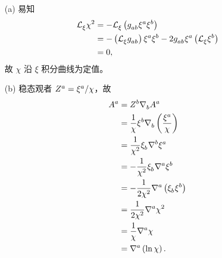 \begin{xiti}
    \begin{zm}
        \begin{enumerate}
            \item[(a)] 易知
            \begin{equation*}
                \begin{split}
                    \Ld{\xi} \chi^2 &= - \Ld{\xi} \left( \tensor{g}{_a_b} \tensor{\xi}{^a} \tensor{\xi}{^b} \right)\\
                    &= - \left( \Ld{\xi} \tensor{g}{_a_b} \right) \tensor{\xi}{^a} \tensor{\xi}{^b} - 2 \tensor{g}{_a_b} \tensor{\xi}{^a} \left( \Ld{\xi} \tensor{\xi}{^b} \right)\\
                    &= 0,
                \end{split}
            \end{equation*}
            故 $\chi$ 沿 $\xi$ 积分曲线为定值。
            \item[(b)] 稳态观者 $\tensor{Z}{^a} = \tensor{\xi}{^a}/\chi$，故
            \begin{align*}
                \tensor{A}{^a} &= \tensor{Z}{^b} \Nabla{b} \tensor{A}{^a}\\
                &= \frac{1}{\chi} \tensor{\xi}{^b} \Nabla{b} \left( \frac{\tensor{\xi}{^a}}{\chi} \right)\\
                &= \frac{1}{\chi^2} \tensor{\xi}{_b} \tensor{\nabla}{^b} \tensor{\xi}{^a}\\
                &= - \frac{1}{\chi^2} \tensor{\xi}{_b} \tensor{\nabla}{^a} \tensor{\xi}{^b}\\
                &= - \frac{1}{2 \chi^2} \tensor{\nabla}{^a} \left( \tensor{\xi}{_b} \tensor{\xi}{^b} \right)\\
                &= \frac{1}{2 \chi^2} \tensor{\nabla}{^a} \chi^2\\
                &= \frac{1}{\chi} \tensor{\nabla}{^a} \chi\\
                &= \tensor{\nabla}{^a} \left( \ln \chi \right).
            \end{align*}
        \end{enumerate}
    \end{zm}
    
\end{xiti}
